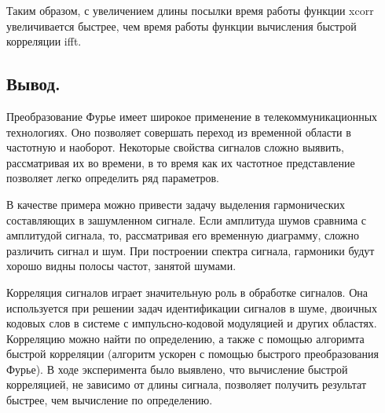 \documentclass[a4paper,14pt]{extarticle}
\begin{document}
Таким образом, с увеличением длины посылки время работы функции xcorr увеличивается быстрее, чем время работы функции вычисления быстрой корреляции ifft. 

\subsection{Вывод.}
Преобразование Фурье имеет широкое применение в телекоммуникационных технологиях. Оно позволяет совершать переход из временной области в частотную и наоборот. Некоторые свойства сигналов сложно выявить, рассматривая их во времени, в то время как их частотное представление позволяет легко определить ряд параметров.

В качестве примера можно привести задачу выделения гармонических
составляющих в зашумленном сигнале. Если амплитуда шумов сравнима с
амплитудой сигнала, то, рассматривая его временную диаграмму, сложно различить сигнал и шум. При построении спектра сигнала, гармоники будут хорошо видны полосы частот, занятой шумами.

Корреляция сигналов играет значительную роль в обработке сигналов. Она используется при решении задач идентификации сигналов в шуме, двоичных кодовых слов в системе с импульсно-кодовой модуляцией и других областях. Корреляцию можно найти по определению, а также с помощью алгоримта быстрой корреляции (алгоритм ускорен с помощью быстрого преобразования Фурье). В ходе эксперимента было выявлено, что вычисление быстрой корреляцией, не зависимо от длины сигнала, позволяет получить результат быстрее, чем вычисление по определению. 
\end{document}

